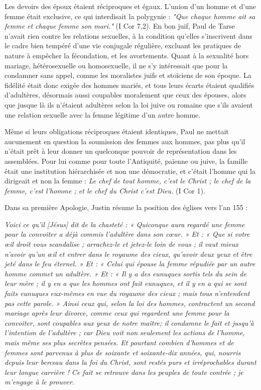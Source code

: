 Les devoirs des époux étaient réciproques et égaux. L'union d'un homme et d'une femme était exclusive, ce qui interdisait la polygynie : \emph{"Que chaque homme ait sa femme et chaque femme son mari."} (I Cor 7,2). En bon juif, Paul de Tarse n'avait rien contre les relations sexuelles, à la condition qu'elles s'inscrivent dans le cadre bien tempéré d'une vie conjugale régulière, excluant les pratiques de nature à empêcher la fécondation, et les avortements. Quant à la sexualité hors mariage, hétérosexuelle ou homosexuelle, il ne s'y intéressait que pour la condamner sans appel, comme les moralistes juifs et stoïciens de son époque. La fidélité était donc exigée des hommes mariés, et tous leurs écarts étaient qualifiés d'adultères, désormais aussi coupables moralement que ceux des épouses, alors que jusque là ils n'étaient adultères selon la loi juive ou romaine que s'ils avaient une relation sexuelle avec la femme légitime d'un autre homme. 
 
 Même si leurs obligations réciproques étaient identiques, Paul ne mettait aucunement en question la soumission des femmes aux hommes, pas plus qu'il n'était prêt à leur donner un quelconque pouvoir de représentation dans les assemblées. Pour lui comme pour toute l'Antiquité, païenne ou juive, la famille était une institution hiérarchisée et non une démocratie, et c'était l'homme qui la dirigeait et non la femme : \emph{Le chef de tout homme, c'est le Christ ; le chef de la femme, c'est l'homme ; et le chef du Christ c'est Dieu.} (I Cor 1).


Dans sa première Apologie, Justin résume la position des églises vers l'an 155 :

\begin{displayquote}
\emph{Voici ce qu'il \emph{[Jésus]} dit de la chasteté : « Quiconque aura regardé une femme pour la convoiter a déjà commis l'adultère dans son cœur. » Et : « Que si votre œil droit vous scandalise ; arrachez-le et jetez-le loin de vous ; il vaut mieux n'avoir qu'un œil et entrer dans le royaume des cieux, qu'avoir deux yeux et être jeté dans le feu éternel. » Et : « Celui qui épouse la femme répudiée par un autre homme commet un adultère. » Et : « Il y a des eunuques sortis tels du sein de leur mère ; il y en a que les hommes ont fait eunuques, et il y en a qui se sont faits eunuques eux-mêmes en vue du royaume des cieux ; mais tous n'entendent pas cette parole. » Ainsi ceux qui, selon la loi des hommes, contractent un second mariage après leur divorce, comme ceux qui regardent une femme pour la convoiter, sont coupables aux yeux de notre maître; il condamne le fait et jusqu'à l'intention de l'adultère ; car Dieu voit non seulement les actions de l'homme, mais même ses plus secrètes pensées. Et pourtant combien d'hommes et de femmes sont parvenus à plus de soixante et soixante-dix années, qui, nourris depuis leur berceau dans la foi du Christ, sont restés purs et irréprochables durant leur longue carrière ! Ce fait se retrouve dans les peuples de toute contrée ; je m'engage à le prouver.}
\end{displayquote}
 
